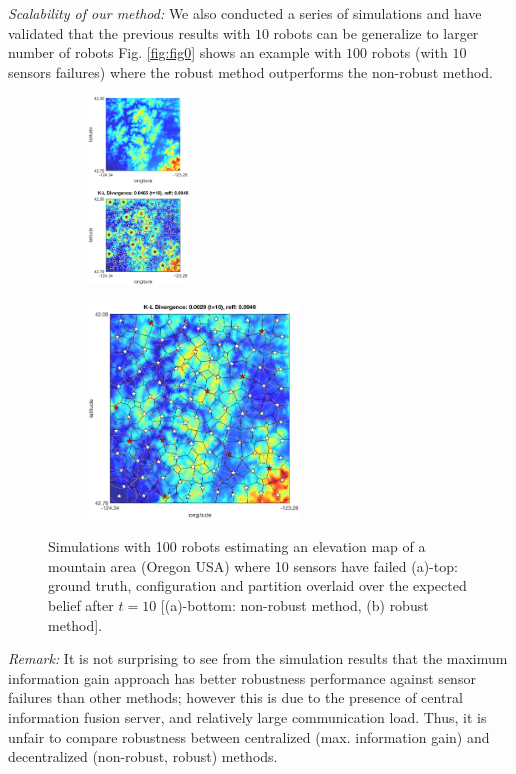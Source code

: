 \documentclass[letterpaper, 10 pt, conference]{ieeeconf}
\begin{document}
\textit{Scalability of our method:} We also conducted a series of simulations and have validated that the previous results with $10$ robots can be generalize to larger number of robots Fig. \ref{fig:fig0} shows an example with $100$ robots (with $10$ sensors failures) where the robust method outperforms the non-robust method. 
\begin{figure}
	\centering
\begin{subfigure}[b]{0.17\textwidth}
	\includegraphics[width=1.05in]{figure/100_order1_last_left}
		\centering
		\caption{}
	\end{subfigure}
\begin{subfigure}[b]{0.30\textwidth}
	\includegraphics[width=2.2in]{figure/100_order2_last}
			\centering
	\caption{}
\end{subfigure}
	\caption{Simulations with 100 robots estimating an elevation map of a mountain area (Oregon USA) where 10 sensors have failed (a)-top: ground truth, configuration and partition overlaid over the expected belief after $t=10$ [(a)-bottom: non-robust method, (b) robust method].}
	\label{fig:fig9}
\end{figure}

\textit{Remark:} It is not surprising to see from the simulation results that the maximum information gain approach has better robustness performance against sensor failures than other methods; however this is due to the presence of central information fusion server, and relatively large communication load. Thus, it is unfair to compare robustness between centralized (max. information gain) and decentralized (non-robust, robust) methods.
\end{document}
